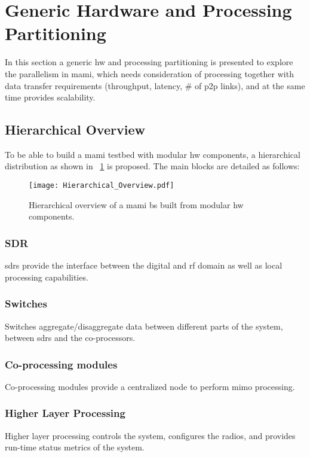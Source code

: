 \documentclass[journal]{IEEEtran}
\begin{document}
%
%
%
%

\section{Generic Hardware and Processing Partitioning}
\label{sec:Generinc_Partitioning}
In this section a generic \gls{hw} and processing partitioning is presented
%
to explore the parallelism in \gls{mami}, which needs consideration of processing together with data transfer requirements (throughput, latency, \# of \gls{p2p} links), and at the same time provides scalability.

\subsection{Hierarchical Overview}
%
%
To be able to build a \gls{mami} testbed with modular \gls{hw} components, a hierarchical distribution as shown in \figurename~\ref{fig:Hierarchical_Overview} is proposed.
The main blocks are detailed as follows:
\begin{figure}
	\centering
	\texttt{[image: Hierarchical\_Overview.pdf]}
	\caption{Hierarchical overview of a \gls{mami} \gls{bs} built from modular \gls{hw} components.}
	\label{fig:Hierarchical_Overview}
\end{figure}

\subsubsection{SDR} \glspl{sdr} provide the interface between the digital and \gls{rf} domain as well as local processing capabilities.
%
%

\subsubsection{Switches} Switches aggregate/disaggregate data between different parts of the system, \eg between \glspl{sdr} and the co-processors.
%
%

\subsubsection{Co-processing modules}
Co-processing modules provide a centralized node to perform \gls{mimo} processing.
%
%

\subsubsection{Higher Layer Processing} 
Higher layer processing controls the system, configures the radios, and provides run-time status metrics of the system.
\end{document}
